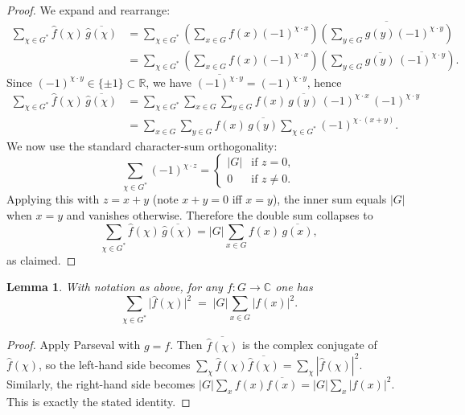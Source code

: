 \documentclass[12pt,twoside,]{amsart}
\theoremstyle{plain}
\newtheorem{lemma}[theorem]{Lemma}
\theoremstyle{definition}
\begin{document}
\begin{proof}
We expand and rearrange:
\begin{align*}
\sum_{\chi\in G^*}\widehat f(\chi)\,\overline{\widehat g(\chi)}
&=
\sum_{\chi\in G^*}\left(\sum_{x\in G} f(x)(-1)^{\chi\cdot x}\right)
\overline{\left(\sum_{y\in G} g(y)(-1)^{\chi\cdot y}\right)}\\
&=
\sum_{\chi\in G^*}\left(\sum_{x\in G} f(x)(-1)^{\chi\cdot x}\right)
\left(\sum_{y\in G} \overline{g(y)}\,\overline{(-1)^{\chi\cdot y}}\right).
\end{align*}
Since $(-1)^{\chi\cdot y}\in\{\pm 1\}\subset \mathbb R$, we have
$\overline{(-1)^{\chi\cdot y}}=(-1)^{\chi\cdot y}$, hence
\begin{align*}
\sum_{\chi\in G^*}\widehat f(\chi)\,\overline{\widehat g(\chi)}
&=
\sum_{\chi\in G^*}\sum_{x\in G}\sum_{y\in G}
f(x)\,\overline{g(y)}\,(-1)^{\chi\cdot x}\,(-1)^{\chi\cdot y}\\
&=
\sum_{x\in G}\sum_{y\in G}
f(x)\,\overline{g(y)}
\sum_{\chi\in G^*}(-1)^{\chi\cdot(x+y)}.
\end{align*}
We now use the standard character-sum orthogonality:
\[
\sum_{\chi\in G^*}(-1)^{\chi\cdot z}
=
\begin{cases}
|G| & \text{if } z=0,\\
0   & \text{if } z\neq 0.
\end{cases}
\]
Applying this with $z=x+y$ (note $x+y=0$ iff $x=y$), the inner sum equals $|G|$
when $x=y$ and vanishes otherwise. Therefore the double sum collapses to
\[
\sum_{\chi\in G^*}\widehat f(\chi)\,\overline{\widehat g(\chi)}
=
|G|\sum_{x\in G} f(x)\,\overline{g(x)},
\]
as claimed.
\end{proof}

\begin{lemma}\label{Plancherel for the unnormalized Fourier transform}
With notation as above, for any $f:G\to\mathbb C$ one has
\[
\sum_{\chi\in G^*}\bigl|\widehat f(\chi)\bigr|^2
\;=\;
|G|\sum_{x\in G}|f(x)|^2.
\]
\end{lemma}

\begin{proof}
Apply Parseval with $g=f$. Then $\overline{\widehat f(\chi)}$ is the complex
conjugate of $\widehat f(\chi)$, so the left-hand side becomes
$\sum_{\chi} \widehat f(\chi)\overline{\widehat f(\chi)}
=\sum_{\chi}|\widehat f(\chi)|^2$.
Similarly, the right-hand side becomes $|G|\sum_x f(x)\overline{f(x)}
=|G|\sum_x |f(x)|^2$. This is exactly the stated identity.
\end{proof}
\end{document}
